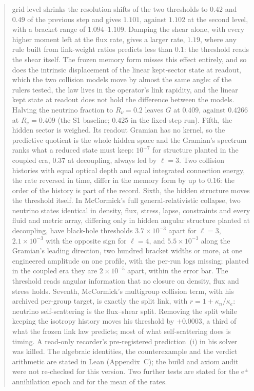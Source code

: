 \documentclass[11pt]{article}
\begin{document}
\begin{abstract}
grid level shrinks the resolution shifts of the two thresholds to $0.42$ and $0.49$ of the previous step and gives $1.101$, against $1.102$ at the second level, with a bracket range of $1.094$--$1.109$. Damping the shear alone, with every higher moment left at the flux rate, gives a larger rate, $1.19$, where any rule built from link-weight ratios predicts less than $0.1$: the threshold reads the shear itself. The frozen memory form misses this effect entirely, and so does the intrinsic displacement of the linear kept-sector state at readout, which the two collision models move by almost the same angle: of the rulers tested, the law lives in the operator's link rapidity, and the linear kept state at readout does not hold the difference between the models. Halving the neutrino fraction to $R_\nu=0.2$ leaves $G$ at $0.409$, against $0.4266$ at $R_\nu=0.409$ (the S1 baseline; $0.425$ in the fixed-step run). Fifth, the hidden sector is weighed. Its readout Gramian has no kernel, so the predictive quotient is the whole hidden space and the Gramian's spectrum ranks what a reduced state must keep: $10^{-7}$ for structure planted in the coupled era, $0.37$ at decoupling, always led by $\ell=3$. Two collision histories with equal optical depth and equal integrated connection energy, the rate reversed in time, differ in the memory form by up to $0.16$: the order of the history is part of the record. Sixth, the hidden structure moves the threshold itself. In McCormick's full general-relativistic collapse, two neutrino states identical in density, flux, stress, lapse, constraints and every fluid and metric array, differing only in hidden angular structure planted at decoupling, have black-hole thresholds $3.7\times10^{-3}$ apart for $\ell=3$, $2.1\times10^{-3}$ with the opposite sign for $\ell=4$, and $5.5\times10^{-3}$ along the Gramian's leading direction, two hundred bracket widths or more, at one engineered amplitude on one profile, with the per-run logs missing; planted in the coupled era they are $2\times10^{-5}$ apart, within the error bar. The threshold reads angular information that no closure on density, flux and stress holds. Seventh, McCormick's multigroup collision term, with his archived per-group target, is exactly the split link, with $r=1+\kappa_n/\kappa_e$: neutrino self-scattering is the flux--shear split. Removing the split while keeping the isotropy history moves his threshold by $+0.0003$, a third of what the frozen link law predicts; most of what self-scattering does is timing. A read-only recorder's pre-registered prediction~(i) in his solver was killed. The algebraic identities, the counterexample and the verdict arithmetic are stated in Lean (Appendix~C); the build and axiom audit were not re-checked for this version. Two further tests are stated for the e$^\pm$ annihilation epoch and for the mean of the rates.
\end{abstract}
\end{document}
